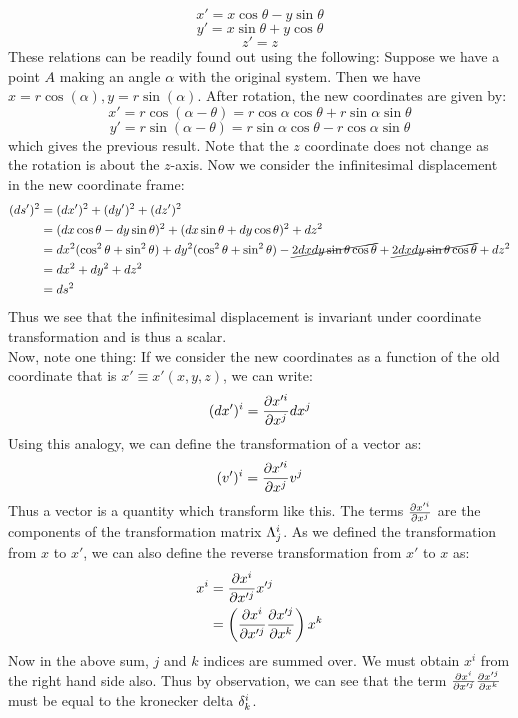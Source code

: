 $$x' = x\cos\theta - y\sin\theta$$
$$y' = x\sin\theta + y\cos\theta$$
$$z' = z$$
These relations can be readily found out using the following: Suppose we have a point $A$ making an angle $\alpha$ with the original system. Then we have $x = r\cos(\alpha), y = r\sin(\alpha)$. After rotation, the new coordinates are given by:
$$x' = r\cos(\alpha - \theta) = r\cos\alpha\cos\theta + r\sin\alpha\sin\theta$$
$$y' = r\sin(\alpha - \theta) = r\sin\alpha\cos\theta - r\cos\alpha\sin\theta$$
which gives the previous result. Note that the $z$ coordinate does not change as the rotation is about the $z$-axis. Now we consider the infinitesimal displacement in the new coordinate frame:
\begin{align*}
    (ds')^2 &= (dx')^2 + (dy')^2 + (dz')^2\\
    &= (dx\cos\theta - dy\sin\theta)^2 + (dx\sin\theta + dy\cos\theta)^2 + dz^2\\
    &= dx^2(\cos^2\theta+\sin^2\theta) + dy^2(\cos^2\theta+\sin^2\theta)- \cancel{2dxdy\sin\theta\cos\theta} +  \cancel{2dxdy\sin\theta\cos\theta} + dz^2\\
    &= dx^2 + dy^2 + dz^2\\
    &= ds^2
\end{align*}
Thus we see that the infinitesimal displacement is invariant under coordinate transformation and is thus a scalar.\\[0.3cm]
Now, note one thing: If we consider the new coordinates as a function of the old coordinate that is $x' \equiv x'(x,y,z)$, we can write: 
$$(dx')^i = \pdv{x'^i}{x^j}dx^j$$
Using this analogy, we can define the transformation of a vector as:
$$(v')^i = \pdv{x'^i}{x^j}v^j$$
Thus a vector is a quantity which transform like this. The terms $\pdv{x'^i}{x^j}$ are the components of the transformation matrix $\tensor*{\Lambda}{^i_j}$.
As we defined the transformation from $x$ to $x'$, we can also define the reverse transformation from $x'$ to $x$ as:
\begin{align*}
    x^i &= \pdv{x^i}{x'^j} x'^j \\
    & =  \left( \pdv{x^i}{x'^j}\pdv{x'^j}{x^k} \right)x^k \\
\end{align*}
Now in the above sum, $j$ and $k$ indices are summed over. We must obtain $x^i$ from the right hand side also. Thus by observation, we can see that the term $\pdv{x^i}{x'^j}\pdv{x'^j}{x^k}$ must be equal to the kronecker delta $\tensor*{\delta}{^i_k}$.
